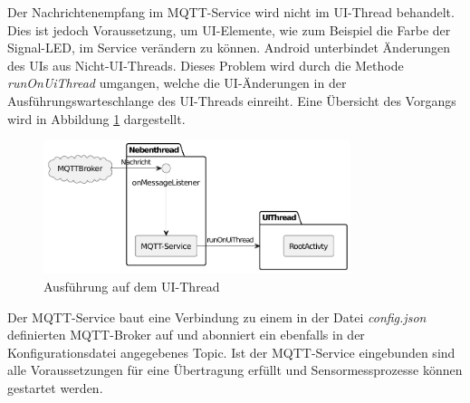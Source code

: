 \documentclass[11pt,a4paper]{report}
\begin{document}
Der Nachrichtenempfang im MQTT-Service wird nicht im UI-Thread behandelt.
Dies ist jedoch Voraussetzung, um UI-Elemente, wie zum Beispiel die Farbe der Signal-LED, im Service verändern zu können.
Android unterbindet Änderungen des UIs aus Nicht-UI-Threads.
Dieses Problem wird durch die Methode \textit{runOnUiThread} umgangen, welche die UI-Änderungen in der Ausführungswarteschlange des UI-Threads einreiht.
Eine Übersicht des Vorgangs wird in Abbildung \ref{fig:runOnUiThread} dargestellt.
\begin{figure}[htbp]
  \centering
  \includegraphics[width=0.8\textwidth]{images/runOnUiThread.pdf}
  \caption{Ausführung auf dem UI-Thread}
  \label{fig:runOnUiThread}
\end{figure}
Der MQTT-Service baut eine Verbindung zu einem in der Datei \textit{config.json} definierten MQTT-Broker auf und abonniert ein ebenfalls in der Konfigurationsdatei angegebenes Topic.
Ist der MQTT-Service eingebunden sind alle Voraussetzungen für eine Übertragung erfüllt und Sensormessprozesse können gestartet werden.
\end{document}

